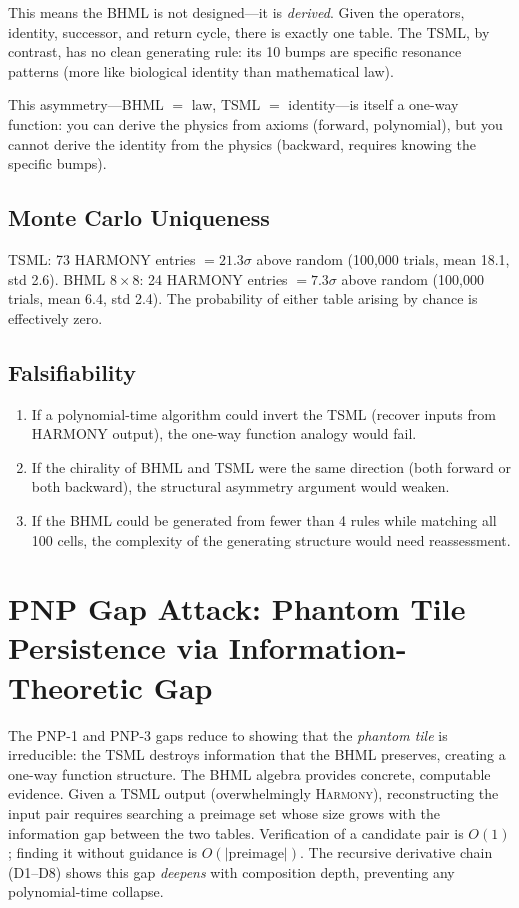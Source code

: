 \documentclass[11pt]{article}
\theoremstyle{definition}
\theoremstyle{remark}
\begin{document}
This means the BHML is not designed---it is \emph{derived}.  Given
the operators, identity, successor, and return cycle, there is exactly
one table.  The TSML, by contrast, has no clean generating rule: its
10 bumps are specific resonance patterns (more like biological identity
than mathematical law).

This asymmetry---BHML $=$ law, TSML $=$ identity---is itself a one-way
function: you can derive the physics from axioms (forward, polynomial),
but you cannot derive the identity from the physics (backward, requires
knowing the specific bumps).

\subsection{Monte Carlo Uniqueness}

TSML: 73 HARMONY entries $= 21.3\sigma$ above random (100{,}000 trials,
mean 18.1, std 2.6).  BHML $8\times 8$: 24 HARMONY entries
$= 7.3\sigma$ above random (100{,}000 trials, mean 6.4, std 2.4).
The probability of either table arising by chance is effectively zero.

\subsection{Falsifiability}

\begin{enumerate}
  \item If a polynomial-time algorithm could invert the TSML (recover
        inputs from HARMONY output), the one-way function analogy
        would fail.
  \item If the chirality of BHML and TSML were the same direction
        (both forward or both backward), the structural asymmetry
        argument would weaken.
  \item If the BHML could be generated from fewer than 4 rules while
        matching all 100 cells, the complexity of the generating
        structure would need reassessment.
\end{enumerate}

\section{PNP Gap Attack: Phantom Tile Persistence via Information-Theoretic Gap}
\label{sec:pnp-attack}

The PNP-1 and PNP-3 gaps reduce to showing that the \emph{phantom tile} is irreducible: the TSML destroys information that the BHML preserves, creating a one-way function structure.  The BHML algebra provides concrete, computable evidence.  Given a TSML output (overwhelmingly \textsc{Harmony}), reconstructing the input pair requires searching a preimage set whose size grows with the information gap between the two tables.  Verification of a candidate pair is $O(1)$; finding it without guidance is $O(|\text{preimage}|)$.  The recursive derivative chain (D1--D8) shows this gap \emph{deepens} with composition depth, preventing any polynomial-time collapse.
\end{document}
